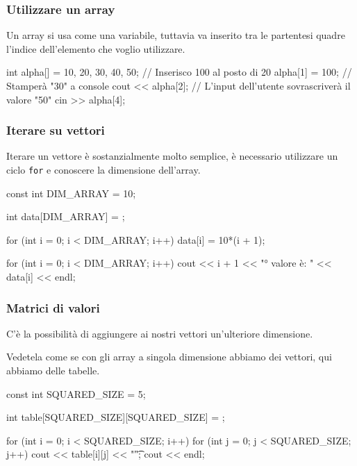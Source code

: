 \documentclass{beamer}
\begin{document}
    \begin{frame}[fragile]
        \frametitle{Utilizzare un array}
            
        Un array si usa come una variabile, tuttavia va inserito tra le partentesi quadre l'indice dell'elemento che voglio utilizzare.
        \begin{cppcode}
            int alpha[] = {10, 20, 30, 40, 50};
            // Inserisco 100 al posto di 20
            alpha[1] = 100;
            // Stamperà "30" a console
            cout << alpha[2];
            // L'input dell'utente sovrascriverà il valore "50"
            cin >> alpha[4];
        \end{cppcode}
    
    \end{frame}

    \begin{frame}[fragile]
        \frametitle{Iterare su vettori}

        Iterare un vettore è sostanzialmente molto semplice, è necessario utilizzare un ciclo \texttt{for} e conoscere la dimensione dell'array.
        \begin{cppcode}
            const int DIM_ARRAY = 10;

            int data[DIM_ARRAY] = {};
            
            for (int i = 0; i < DIM_ARRAY; i++) {
                data[i] = 10*(i + 1);
            }
            
            for (int i = 0; i < DIM_ARRAY; i++) {
                cout << i + 1 << "° valore è: " << data[i] << endl;
            }
        \end{cppcode} 

    \end{frame}

    \begin{frame}[fragile]
        \frametitle{Matrici di valori}
    
        C'è la possibilità di aggiungere ai nostri vettori un'ulteriore dimensione. 

        Vedetela come se con gli array a singola dimensione abbiamo dei vettori, qui abbiamo delle tabelle.

        \begin{cppcode}
            const int SQUARED_SIZE = 5;

            int table[SQUARED_SIZE][SQUARED_SIZE] = {};

            for (int i = 0; i < SQUARED_SIZE; i++) {
                for (int j = 0; j < SQUARED_SIZE; j++) {
                    cout << table[i][j] << "\t";
                }
                cout << endl;
            }
        \end{cppcode}
    
    \end{frame}
\end{document}
